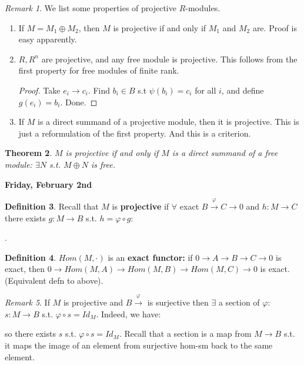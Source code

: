 \documentclass[9pt,reqno,twoside]{amsbook}
\theoremstyle{plain}
\newtheorem{theorem}{Theorem}[chapter]
\numberwithin{section}{chapter}
\numberwithin{equation}{chapter}
\theoremstyle{definition}
\newtheorem{Def}[theorem]{Definition}
\theoremstyle{remark}
\newtheorem{rem}[theorem]{Remark}
\theoremstyle{plain}
\renewcommand{\phi}{\varphi}
\begin{document}
\begin{rem}
We list some properties of projective $R$-modules. 

\begin{enumerate}
\item If $M = M_1 \oplus M_2$, then $M$ is projective if and only if $M_1$ and $M_2$ are. Proof is easy apparently. 

\item $R,R^n$ are projective, and any free module is projective. This follows from the first property for free modules of finite rank. 
\begin{proof}
Take $e_i \to c_i$. Find $b_i \in B$ s.t $\psi(b_i) = c_i$ for all $i$, and define $g(e_i) = b_i$. Done. 
\end{proof}

\item If $M$ is a direct summand of a projective module, then it is projective. This is just a reformulation of the first property. And this is a criterion. 
\end{enumerate}
\end{rem}

\begin{theorem}
$M$ is projective if and only if $M$ is a direct summand of a free module: $ \exists N$ s.t. $M \oplus N$ is free. 
\end{theorem}

\textbf{Friday, February 2nd}

\begin{Def}
Recall that $M$ is \textbf{projective} if $\forall$ exact $B \overset{\phi}{\to} C \to 0$ and $h:M \to C$ there exists $g:M \to B$ s.t. $h = \phi \circ g$:
\begin{center}
. 
\end{center}
\end{Def}

\begin{Def}
$Hom(M,\cdot)$ is an \textbf{exact functor:} if $0 \to A \to B \to C \to 0$ is exact, then $0 \to Hom(M,A) \to Hom(M,B) \to Hom(M,C) \to 0$ is exact. (Equivalent defn to above). 
\end{Def}


\begin{rem}
If $M$ is projective and $B \overset{\phi}{\to} $ is surjective then $\exists$ a section of $\phi:$ $s:M \to B$ s.t. $\phi \circ s = Id_M$. Indeed, we have: 
\begin{center}
\end{center}
so there exists $s$ s.t. $\phi\circ s = Id_M$. Recall that a section is a map from $M \to B$ s.t. it maps the image of an element from surjective hom-sm back to the same element. 
\end{rem}
\end{document}
